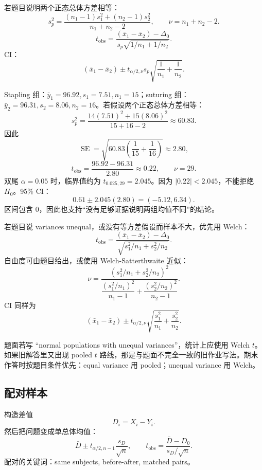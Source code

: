 \documentclass[11pt,a4paper]{article}
\newcommand{\SE}{\operatorname{SE}}
\begin{document}
\begin{templatebox}
若题目说明两个正态总体方差相等：
\[
  s_p^2=
  \frac{(n_1-1)s_1^2+(n_2-1)s_2^2}{n_1+n_2-2},
  \qquad
  \nu=n_1+n_2-2.
\]
\[
  t_{\mathrm{obs}}
  =
  \frac{(\bar x_1-\bar x_2)-\Delta_0}
  {s_p\sqrt{1/n_1+1/n_2}}.
\]
CI：
\[
  (\bar x_1-\bar x_2)
  \pm
  t_{\alpha/2,\nu}s_p\sqrt{\frac1{n_1}+\frac1{n_2}}.
\]
\end{templatebox}

\begin{examplebox}
Stapling 组：$\bar y_1=96.92,s_1=7.51,n_1=15$；suturing 组：
$\bar y_2=96.31,s_2=8.06,n_2=16$。若假设两个正态总体方差相等：
\[
  s_p^2
  =
  \frac{14(7.51)^2+15(8.06)^2}{15+16-2}
  \approx60.83.
\]
因此
\[
  \SE
  =
  \sqrt{60.83\left(\frac1{15}+\frac1{16}\right)}
  \approx2.80,
\]
\[
  t_{\mathrm{obs}}
  =
  \frac{96.92-96.31}{2.80}
  \approx0.22,\qquad \nu=29.
\]
双尾 $\alpha=0.05$ 时，临界值约为 $t_{0.025,29}=2.045$。因为 $|0.22|<2.045$，不能拒绝 $H_0$。95\% CI：
\[
  0.61\pm2.045(2.80)
  =
  (-5.12,6.34).
\]
区间包含 0，因此也支持“没有足够证据说明两组均值不同”的结论。
\end{examplebox}

\begin{templatebox}
若题目说 variances unequal，或没有等方差假设而样本不大，优先用 Welch：
\[
  t_{\mathrm{obs}}
  =
  \frac{(\bar x_1-\bar x_2)-\Delta_0}
  {\sqrt{s_1^2/n_1+s_2^2/n_2}}.
\]
自由度可由题目给出，或使用 Welch-Satterthwaite 近似：
\[
  \nu
  =
  \frac{(s_1^2/n_1+s_2^2/n_2)^2}
  {
  \dfrac{(s_1^2/n_1)^2}{n_1-1}
  +
  \dfrac{(s_2^2/n_2)^2}{n_2-1}
  }.
\]
CI 同样为
\[
  (\bar x_1-\bar x_2)
  \pm
  t_{\alpha/2,\nu}
  \sqrt{\frac{s_1^2}{n_1}+\frac{s_2^2}{n_2}}.
\]
\end{templatebox}

\begin{warnbox}
题面若写 “normal populations with unequal variances”，统计上应使用 Welch $t$。如果旧解答里又出现 pooled $t$ 路线，那是与题面不完全一致的旧作业写法。期末作答时按题目条件优先：equal variance 用 pooled；unequal variance 用 Welch。
\end{warnbox}

\subsection{配对样本}

\begin{templatebox}[配对样本推断]
构造差值
\[
  D_i=X_i-Y_i.
\]
然后把问题变成单总体均值：
\[
  \bar D\pm t_{\alpha/2,n-1}\frac{s_D}{\sqrt n},
  \qquad
  t_{\mathrm{obs}}=\frac{\bar D-D_0}{s_D/\sqrt n}.
\]
配对的关键词：same subjects, before-after, matched pairs。
\end{templatebox}
\end{document}

